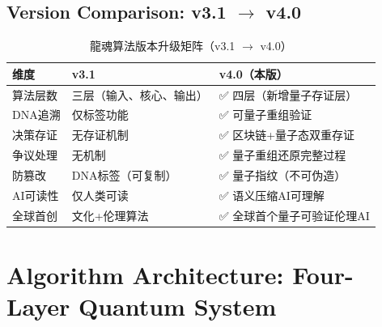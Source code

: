 % 


\subsection*{Version Comparison: v3.1 $\to$ v4.0}
\label{ssec:version-v4}

\begin{table}[H]
\centering
\caption{龍魂算法版本升级矩阵（v3.1 $\to$ v4.0）}
\label{tab:version-v4}
\renewcommand{\arraystretch}{1.4}
\begin{tabular}{p{3.0cm} p{4.5cm} p{4.5cm}}
\toprule
\textbf{维度} & \textbf{v3.1} & \textbf{v4.0（本版）} \\
\midrule
算法层数
  & 三层（输入、核心、输出）
  & ✅ 四层（新增量子存证层） \\
DNA追溯
  & 仅标签功能
  & ✅ 可量子重组验证 \\
决策存证
  & 无存证机制
  & ✅ 区块链+量子态双重存证 \\
争议处理
  & 无机制
  & ✅ 量子重组还原完整过程 \\
防篡改
  & DNA标签（可复制）
  & ✅ 量子指纹（不可伪造） \\
AI可读性
  & 仅人类可读
  & ✅ 语义压缩AI可理解 \\
全球首创
  & 文化+伦理算法
  & ✅ 全球首个量子可验证伦理AI \\
\bottomrule
\end{tabular}
\end{table}

\section{Algorithm Architecture: Four-Layer Quantum System}
\label{sec:arch-v4}

